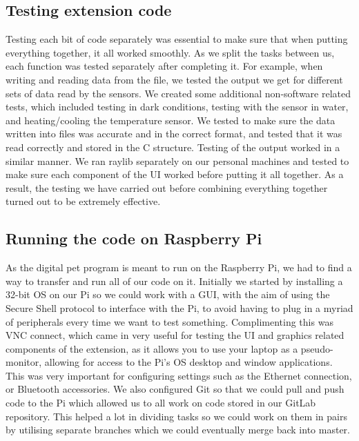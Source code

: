\documentclass[11pt, oneside, UKenglish]{article}
\begin{document}
\subsection{Testing extension code}
Testing each bit of code separately was essential to make sure that when putting everything together, it all worked smoothly.
As we split the tasks between us, each function was tested separately after completing it.
For example, when writing and reading data from the file, we tested the output we get for different sets of data read by the sensors. We created some additional non-software related tests, which included testing in dark conditions, testing with the sensor in water, and heating/cooling the temperature sensor.
We tested to make sure the data written into files was accurate and in the correct format, and tested that it was read correctly and stored in the C structure.
Testing of the output worked in a similar manner. We ran raylib separately on our personal machines and tested to make sure each component of the UI worked before putting it all together. 
As a result, the testing we have carried out before combining everything together turned out to be extremely effective.

\subsection{Running the code on Raspberry Pi}
As the digital pet program is meant to run on the Raspberry Pi, we had to find a way to transfer and run all of our code on it.
Initially we started by installing a 32-bit OS on our Pi so we could work with a GUI, with the aim of using the Secure Shell protocol to interface with the Pi, to avoid having to plug in a myriad of peripherals every time we want to test something.
Complimenting this was VNC connect, which came in very useful for testing the UI and graphics related components of the extension, as it allows you to use your laptop as a pseudo-monitor, allowing for access to the Pi's OS desktop and window applications.
This was very important for configuring settings such as the Ethernet connection, or Bluetooth accessories.
We also configured Git so that we could pull and push code to the Pi which allowed us to all work on code stored in our GitLab repository.
This helped a lot in dividing tasks so we could work on them in pairs by utilising separate branches which we could eventually merge back into master.  
\end{document}
